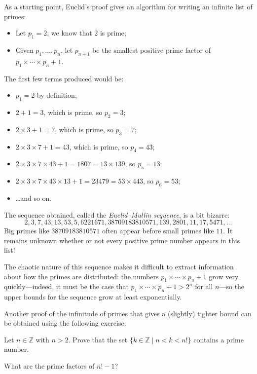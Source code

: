 As a starting point, Euclid's proof gives an algorithm for writing an infinite list of primes:
\begin{itemize}
\item Let $p_1 = 2$; we know that $2$ is prime;
\item Given $p_1, \dots, p_n$, let $p_{n+1}$ be the smallest positive prime factor of $p_1 \times \cdots \times p_n + 1$.
\end{itemize}
The first few terms produced would be:
\begin{itemize}
\item $p_1 = 2$ by definition;
\item $2+1=3$, which is prime, so $p_2=3$;
\item $2 \times 3 + 1 = 7$, which is prime, so $p_3 = 7$;
\item $2 \times 3 \times 7 + 1 = 43$, which is prime, so $p_4 = 43$;
\item $2 \times 3 \times 7 \times 43 + 1 = 1807 = 13 \times 139$, so $p_5 = 13$;
\item $2 \times 3 \times 7 \times 43 \times 13 + 1 = 23479 = 53 \times 443$, so $p_6 = 53$;
\item \dots{}and so on.
\end{itemize}

The sequence obtained, called the \textit{Euclid--Mullin sequence}, is a bit bizarre:
\[ 2, 3, 7, 43, 13, 53, 5, 6221671, 38709183810571, 139, 2801, 11, 17, 5471, \dots \]
Big primes like $38709183810571$ often appear before small primes like $11$. It remains unknown whether or not every positive prime number appears in this list!

The chaotic nature of this sequence makes it difficult to extract information about how the primes are distributed: the numbers $p_1 \times \cdots \times p_n + 1$ grow very quickly---indeed, it must be the case that $p_1 \times \cdots \times p_n + 1 > 2^n$ for all $n$---so the upper bounds for the sequence grow at least exponentially.

Another proof of the infinitude of primes that gives a (slightly) tighter bound can be obtained using the following exercise.

\begin{exercise}
\label{exPrimesUsingFactorials}
Let $n \in \mathbb{Z}$ with $n>2$. Prove that the set $\{ k \in \mathbb{Z} \mid n<k<n! \}$ contains a prime number.
\begin{backhint}
What are the prime factors of $n!-1$?
\end{backhint}
\end{exercise}